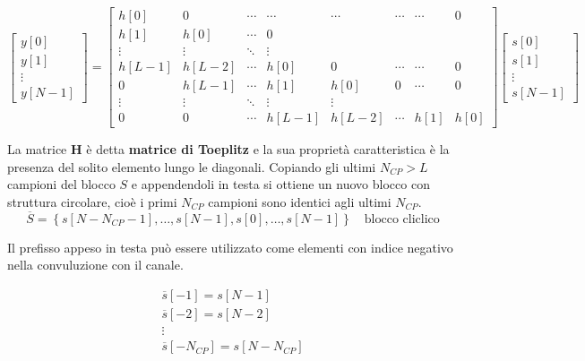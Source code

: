 \[ 
\begin{bmatrix} y[0] \\ y[1] \\ \vdots \\ y[N-1] \end{bmatrix} 
= 
\begin{bmatrix}
    h[0] & 0 & \cdots & \cdots & \cdots & \cdots & \cdots & 0 \\
    h[1] & h[0] & \cdots & 0 \\
    \vdots & \vdots & \ddots & \vdots \\
    h[L-1] & h[L-2] & \cdots & h[0] & 0 & \cdots & \cdots & 0 \\
    0 & h[L-1] & \cdots & h[1] & h[0] & 0 & \cdots & 0 \\
    \vdots & \vdots & \ddots & \vdots & \vdots \\
    0 & 0 & \cdots & h[L-1] & h[L-2] & \cdots & h[1] & h[0]
\end{bmatrix}   
\begin{bmatrix} s[0] \\ s[1] \\ \vdots \\ s[N-1] \end{bmatrix}
\]

La matrice $\mathbf{H}$ è detta \textbf{matrice di Toeplitz} e la sua proprietà caratteristica è la presenza del solito elemento lungo le diagonali. Copiando gli ultimi $N_{CP} > L$ campioni del blocco $S$ e appendendoli in testa si ottiene un nuovo blocco con struttura circolare, cioè i primi $N_{CP}$ campioni sono identici agli ultimi $N_{CP}$.
\[
    \overline{S} = \left\{s\left[N - N_{CP} - 1\right], \ldots, s\left[N - 1\right], s\left[0\right], \ldots, s\left[N - 1\right]\right\} \quad \text{blocco cliclico}
\]

Il prefisso appeso in testa può essere utilizzato come elementi con indice negativo nella convuluzione con il canale.



\[
    \begin{array}{ll}
        \overline{s}[-1] = s[N - 1] \\
        \overline{s}[-2] = s[N - 2] \\
        \vdots \\
        \overline{s}[-N_{CP}] = s[N - N_{CP}]
    \end{array}
\]



